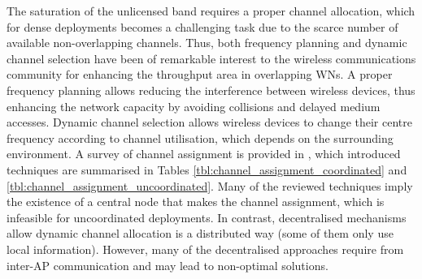 \documentclass[12pt, a4paper,twoside]{tesi_upf}
\begin{document}
		The saturation of the unlicensed band requires a proper channel allocation, which for dense deployments becomes a challenging task due to the scarce number of available non-overlapping channels. Thus, both frequency planning and dynamic channel selection have been of remarkable interest to the wireless communications community for enhancing the throughput area in overlapping WNs. A proper frequency planning allows reducing the interference between wireless devices, thus enhancing the network capacity by avoiding collisions and delayed medium accesses. Dynamic channel selection allows wireless devices to change their centre frequency according to channel utilisation, which depends on the surrounding environment. A survey of channel assignment is provided in \cite{chieochan2010channel}, which introduced techniques are summarised in Tables \ref{tbl:channel_assignment_coordinated} and \ref{tbl:channel_assignment_uncoordinated}. Many of the reviewed techniques imply the existence of a central node that makes the channel assignment, which is infeasible for uncoordinated deployments. In contrast, decentralised mechanisms allow dynamic channel allocation is a distributed way (some of them only use local information). However, many of the decentralised approaches require from inter-AP communication and may lead to non-optimal solutions.
\end{document}
